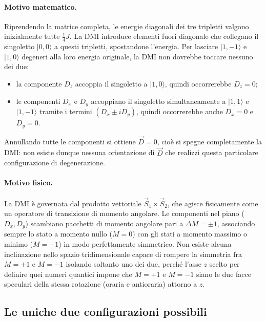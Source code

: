 \documentclass[11pt,a4paper]{article}
\begin{document}
\paragraph{Motivo matematico.} Riprendendo la matrice completa, le energie diagonali
dei tre tripletti valgono inizialmente tutte $\tfrac14 J$. La DMI introduce elementi
fuori diagonale che collegano il singoletto $|0,0\rangle$ a questi tripletti,
spostandone l'energia. Per lasciare $|1,-1\rangle$ e $|1,0\rangle$ degeneri alla loro
energia originale, la DMI non dovrebbe toccare nessuno dei due:
\begin{itemize}
\item la componente $D_z$ accoppia il singoletto a $|1,0\rangle$, quindi occorrerebbe
$D_z=0$;
\item le componenti $D_x$ e $D_y$ accoppiano il singoletto simultaneamente a
$|1,1\rangle$ e $|1,-1\rangle$ tramite i termini $(D_x\pm iD_y)$, quindi occorrerebbe
anche $D_x=0$ e $D_y=0$.
\end{itemize}
Annullando tutte le componenti si ottiene $\vec D=0$, cio\`e si spegne completamente la
DMI: non esiste dunque nessuna orientazione di $\vec D$ che realizzi questa particolare
configurazione di degenerazione.

\paragraph{Motivo fisico.} La DMI \`e governata dal prodotto vettoriale $\vec
S_1\times\vec S_2$, che agisce fisicamente come un operatore di transizione di momento
angolare. Le componenti nel piano ($D_x,D_y$) scambiano pacchetti di momento angolare
pari a $\Delta M=\pm1$, associando sempre lo stato a momento nullo ($M=0$) con gli
stati a momento massimo o minimo ($M=\pm1$) in modo perfettamente simmetrico. Non
esiste alcuna inclinazione nello spazio tridimensionale capace di rompere la simmetria
fra $M=+1$ e $M=-1$ isolando soltanto uno dei due, perch\'e l'asse $z$ scelto per
definire quei numeri quantici impone che $M=+1$ e $M=-1$ siano le due facce speculari
della stessa rotazione (oraria e antioraria) attorno a $z$.

\subsection{Le uniche due configurazioni possibili}
\end{document}

